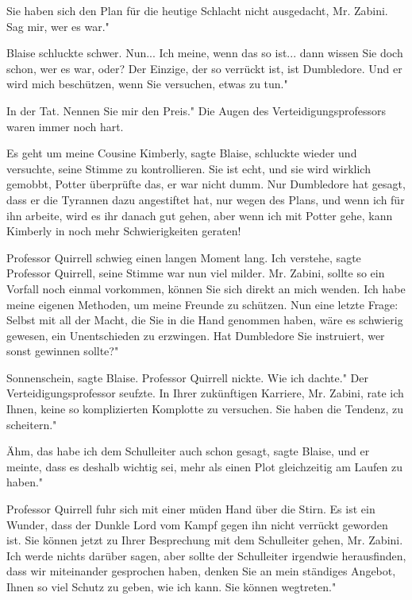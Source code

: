 \glqq{}Sie haben sich den Plan für die heutige Schlacht nicht ausgedacht, Mr.
Zabini. Sag mir, wer es war."

Blaise schluckte schwer. \glqq{}Nun... Ich meine, wenn das so ist... dann wissen
Sie doch schon, wer es war, oder? Der Einzige, der so verrückt ist, ist
Dumbledore. Und er wird mich beschützen, wenn Sie versuchen, etwas zu tun."

\glqq{}In der Tat. Nennen Sie mir den Preis." Die Augen des
Verteidigungsprofessors waren immer noch hart.

\glqq{}Es geht um meine Cousine Kimberly\grqq{}, sagte Blaise, schluckte wieder
und versuchte, seine Stimme zu kontrollieren. \glqq{}Sie ist echt, und sie wird
wirklich gemobbt\grqq{}, Potter überprüfte das, er war nicht dumm. Nur
Dumbledore hat gesagt, dass er die Tyrannen dazu angestiftet hat, nur wegen des
Plans, und wenn ich für ihn arbeite, wird es ihr danach gut gehen, aber wenn ich
mit Potter gehe, kann Kimberly in noch mehr Schwierigkeiten geraten!\grqq{}

Professor Quirrell schwieg einen langen Moment lang. \glqq{}Ich verstehe\grqq{},
sagte Professor Quirrell, seine Stimme war nun viel milder. \glqq{}Mr. Zabini,
sollte so ein Vorfall noch einmal vorkommen, können Sie sich direkt an mich
wenden. Ich habe meine eigenen Methoden, um meine Freunde zu schützen. Nun eine
letzte Frage: Selbst mit all der Macht, die Sie in die Hand genommen haben, wäre
es schwierig gewesen, ein Unentschieden zu erzwingen. Hat Dumbledore Sie
instruiert, wer sonst gewinnen sollte?"

\glqq{}Sonnenschein\grqq{}, sagte Blaise. Professor Quirrell nickte. \glqq{}Wie
ich dachte." Der Verteidigungsprofessor seufzte. \glqq{}In Ihrer zukünftigen
Karriere, Mr. Zabini, rate ich Ihnen, keine so komplizierten Komplotte zu
versuchen. Sie haben die Tendenz, zu scheitern."

\glqq{}Ähm, das habe ich dem Schulleiter auch schon gesagt\grqq{}, sagte Blaise,
\glqq{}und er meinte, dass es deshalb wichtig sei, mehr als einen Plot
gleichzeitig am Laufen zu haben."

Professor Quirrell fuhr sich mit einer müden Hand über die Stirn. \glqq{}Es ist
ein Wunder, dass der Dunkle Lord vom Kampf gegen ihn nicht verrückt geworden
ist. Sie können jetzt zu Ihrer Besprechung mit dem Schulleiter gehen, Mr.
Zabini. Ich werde nichts darüber sagen, aber sollte der Schulleiter irgendwie
herausfinden, dass wir miteinander gesprochen haben, denken Sie an mein
ständiges Angebot, Ihnen so viel Schutz zu geben, wie ich kann. Sie können
wegtreten."

